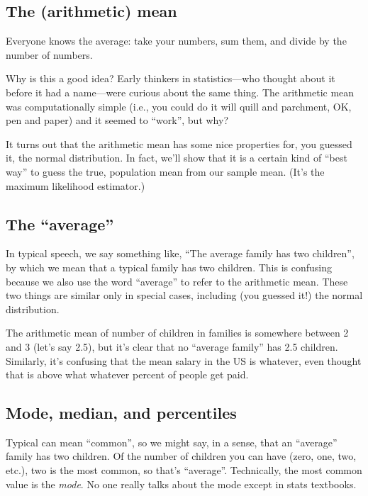 \subsection{The (arithmetic) mean}\label{the-arithmetic-mean}

Everyone knows the average: take your numbers, sum them, and divide by
the number of numbers.

Why is this a good idea? Early thinkers in statistics---who thought
about it before it had a name---were curious about the same thing. The
arithmetic mean was computationally simple (i.e., you could do it will
quill and parchment, OK, pen and paper) and it seemed to ``work'', but
why?

It turns out that the arithmetic mean has some nice properties for, you
guessed it, the normal distribution. In fact, we'll show that it is a
certain kind of ``best way'' to guess the true, population mean from our
sample mean. (It's the maximum likelihood estimator.)

\subsection{The ``average''}

In typical speech, we say something like, ``The average family has two
children'', by which we mean that a typical family has two children.
This is confusing because we also use the word ``average'' to refer to
the arithmetic mean. These two things are similar only in special cases,
including (you guessed it!) the normal distribution.

The arithmetic mean of number of children in families is somewhere
between 2 and 3 (let's say 2.5), but it's clear that no ``average
family'' has 2.5 children. Similarly, it's confusing that the mean
salary in the US is whatever, even thought that is above what whatever
percent of people get paid.

\subsection{Mode, median, and
percentiles}\label{mode-median-and-percentiles}

Typical can mean ``common'', so we might say, in a sense, that an
``average'' family has two children. Of the number of children you can
have (zero, one, two, etc.), two is the most common, so that's
``average''. Technically, the most common value is the \emph{mode}. No
one really talks about the mode except in stats textbooks.

